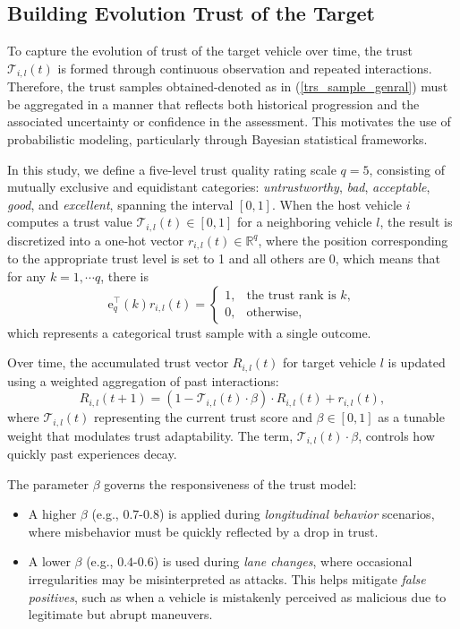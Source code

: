 \documentclass[letterpaper, 10pt, conference]{ieeeconf}  %
\def\eqref#1{(\ref{#1})}
\def\T{\mathcal{T}} %
\begin{document}
\subsection{Building Evolution Trust of the Target} \label{sec_Evolution_trust}
To capture the evolution of trust of the target vehicle over time, the trust $\T_{i,l}(t)$ is formed through continuous observation and repeated interactions. 
Therefore, the trust samples obtained-denoted as in \eqref{trs_sample_genral} must be aggregated in a manner that reflects both historical progression and the associated uncertainty or confidence in the assessment. 
This motivates the use of probabilistic modeling, particularly through Bayesian statistical frameworks. 

In this study, we define a five-level trust quality rating scale $q = 5$, consisting of mutually exclusive and equidistant categories: \textit{untrustworthy}, \textit{bad}, \textit{acceptable}, \textit{good}, and \textit{excellent}, spanning the interval $[0, 1]$. When the host vehicle $i$ computes a trust value $\T_{i,l}(t) \in [0, 1]$ for a neighboring vehicle $l$, the result is discretized into a one-hot vector $r_{i,l}(t) \in \mathbb{R}^q$, where the position corresponding to the appropriate trust level is set to 1 and all others are 0, which means that for any $k = 1, \cdots q$, there is
\begin{equation}
    \text{e}_{q}^{\top}(k)r_{i,l} (t) = \begin{cases}
        1, & \text {the trust rank is $k$}, \\
        0 , & \text {otherwise},
    \end{cases}
\end{equation}
which represents a categorical trust sample with a single outcome. 

Over time, the accumulated trust vector $R_{i,l}(t)$ for target vehicle $l$ is updated using a weighted aggregation of past interactions: 
\begin{equation}
    R_{i,l}(t + 1) = \left(1 - \T_{i,l}(t) \cdot \beta \right) \cdot R_{i,l}(t) + r_{i,l}(t),
\end{equation}
where $\T_{i,l}(t)$ representing the current trust score and $\beta \in [0, 1]$ as a tunable weight that modulates trust adaptability. 
The term, $\T_{i,l}(t) \cdot \beta$, controls how quickly past experiences decay. 

The parameter $\beta$ governs the responsiveness of the trust model:
\begin{itemize}
    \item A higher $\beta$ (e.g., $0.7$-$0.8$) is applied during \textit{longitudinal behavior} scenarios, where misbehavior must be quickly reflected by a drop in trust.
    \item A lower $\beta$ (e.g., $0.4$-$0.6$) is used during \textit{lane changes}, where occasional irregularities may be misinterpreted as attacks. This helps mitigate \textit{false positives}, such as when a vehicle is mistakenly perceived as malicious due to legitimate but abrupt maneuvers.
\end{itemize}
\end{document}
